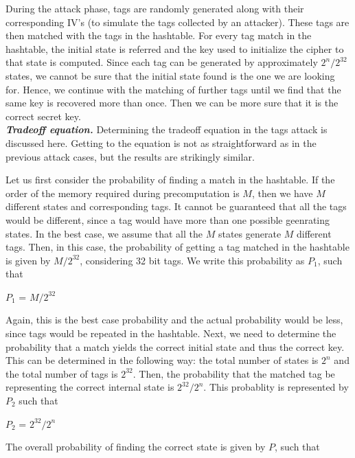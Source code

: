 During the attack phase, tags are randomly generated along with their corresponding IV's (to simulate the tags collected by an attacker). These tags are then matched with the tags in the hashtable. For every tag match in the hashtable, the initial state is referred and the key used to initialize the cipher to that state is computed. Since each tag can be generated by approximately $2^n/2^{32}$ states, we cannot be sure that the initial state found is the one we are looking for. Hence, we continue with the matching of further tags until we find that the same key is recovered more than once. Then we can be more sure that it is the correct secret key.\\

\textit{\textbf{Tradeoff equation.}} Determining the tradeoff equation in the tags attack is discussed here. Getting to the equation is not as straightforward as in the previous attack cases, but the results are strikingly similar.

Let us first consider the probability of finding a match in the hashtable. If the order of the memory required during precomputation is $M$, then we have $M$ different states and corresponding tags. It cannot be guaranteed that all the tags would be different, since a tag would have more than one possible geenrating states. In the best case, we assume that all the $M$ states generate $M$ different tags. Then, in this case, the probability of getting a tag matched in the hashtable is given by $M/2^{32}$, considering 32 bit tags. We write this probability as $P_1$, such that

\begin{center}
\large{$P_1$ = $M/2^{32}$}
\end{center}

Again, this is the best case probability and the actual probability would be less, since tags would be repeated in the hashtable. Next, we need to determine the probability that a match yields the correct initial state and thus the correct key. This can be determined in the following way: the total number of states is $2^n$ and the total number of tags is $2^{32}$. Then, the probability that the matched tag be representing the correct internal state is $2^{32}/2^n$. This probablity is represented by $P_2$ such that

\begin{center}
\large{$P_2$ = $2^{32}/2^n$}
\end{center}

The overall probability of finding the correct state is given by $P$, such that

